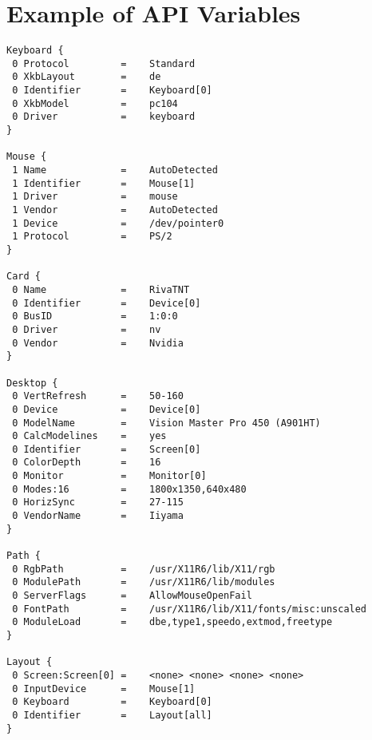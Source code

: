 \section{Example of API Variables}
\begin{small}
\begin{verbatim}
Keyboard {
 0 Protocol         =    Standard
 0 XkbLayout        =    de
 0 Identifier       =    Keyboard[0]
 0 XkbModel         =    pc104
 0 Driver           =    keyboard
}

Mouse {
 1 Name             =    AutoDetected
 1 Identifier       =    Mouse[1]
 1 Driver           =    mouse
 1 Vendor           =    AutoDetected
 1 Device           =    /dev/pointer0
 1 Protocol         =    PS/2
}

Card {
 0 Name             =    RivaTNT
 0 Identifier       =    Device[0]
 0 BusID            =    1:0:0
 0 Driver           =    nv
 0 Vendor           =    Nvidia
}

Desktop {
 0 VertRefresh      =    50-160
 0 Device           =    Device[0]
 0 ModelName        =    Vision Master Pro 450 (A901HT)
 0 CalcModelines    =    yes
 0 Identifier       =    Screen[0]
 0 ColorDepth       =    16
 0 Monitor          =    Monitor[0]
 0 Modes:16         =    1800x1350,640x480
 0 HorizSync        =    27-115
 0 VendorName       =    Iiyama
}

Path {
 0 RgbPath          =    /usr/X11R6/lib/X11/rgb
 0 ModulePath       =    /usr/X11R6/lib/modules
 0 ServerFlags      =    AllowMouseOpenFail
 0 FontPath         =    /usr/X11R6/lib/X11/fonts/misc:unscaled
 0 ModuleLoad       =    dbe,type1,speedo,extmod,freetype
}

Layout {
 0 Screen:Screen[0] =    <none> <none> <none> <none>
 0 InputDevice      =    Mouse[1]
 0 Keyboard         =    Keyboard[0]
 0 Identifier       =    Layout[all]
}
\end{verbatim}
\end{small}


